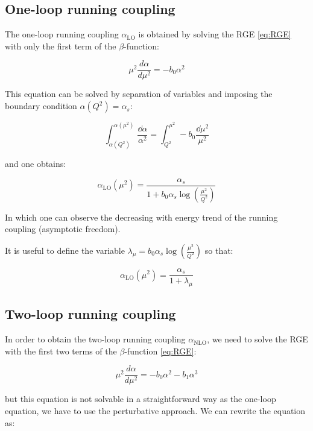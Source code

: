 \documentclass[../main.tex]{subfiles}
\begin{document}
\subsection{One-loop running coupling}

The one-loop running coupling $\alpha_{\text{LO}}$ is obtained by solving the RGE \cref{eq:RGE} with only the first term of the $\beta$-function:

\begin{equation}
    \mu^2 \frac{d\alpha}{d\mu^2} = - b_0 \alpha^2
\end{equation}

This equation can be solved by separation of variables and imposing 
the boundary condition $\alpha(Q^2) = \alpha_s$:

\begin{equation}
   \int_{\alpha(Q^2)}^{\alpha(\mu^2)} \frac{\dd\alpha}{\alpha^2} = \int _{Q^2}^{\mu^2}-b_0 \frac{\dd\mu^2}{\mu^2} 
\end{equation}

and one obtains:

\begin{equation}
    \alpha_{\text{LO}}(\mu^2) = \frac{\alpha_s}{1+b_0 \alpha_s \log(\frac{\mu^2}{Q^2})}
\end{equation}

In which one can observe the decreasing with energy trend of the running coupling (asymptotic freedom).  

It is useful to define the variable $\lambda_\mu = b_0 \alpha_s \log(\frac{\mu^2}{Q^2})$ so that:

\begin{equation}\label{eq:LO running coupling}
    \alpha_{\text{LO}}(\mu^2) = \frac{\alpha_s}{1+\lambda_\mu}
\end{equation}


\subsection{Two-loop running coupling}

In order to obtain the two-loop running coupling $\alpha_{\text{NLO}}$, 
we need to solve the RGE with the first two terms of the $\beta$-function \cref{eq:RGE}:

\begin{equation}
    \mu^2 \frac{d\alpha}{d\mu^2} = - b_0 \alpha^2 - b_1 \alpha^3
\end{equation}

but this equation is not solvable in a straightforward way as the one-loop equation, 
we have to use the perturbative approach. We can rewrite the equation as:
\end{document}
